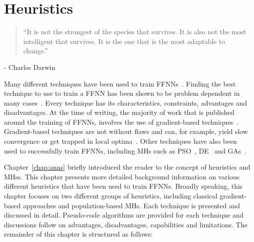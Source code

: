 \chapter{Heuristics}\label{chap:heuristics}

\begin{quotation}
      ``It is not the strongest of the species that survives. It is also not the most intelligent that survives. It is the one that is the most adaptable to change.''
\end{quotation}
\begin{flushright}
      - Charles Darwin
\end{flushright}

Many different techniques have been used to train \acp{FFNN}~\cite{ref:kingma:2014}. Finding the best technique to use to train a \acs{FFNN} has been shown to be problem dependent in many cases~\cite{ref:kheiri:2017}. Every technique has its characteristics, constraints, advantages and disadvantages. At the time of writing, the majority of work that is published around the training of \acp{FFNN}, involves the use of gradient-based techniques~\cite{ref:nel:2021}. Gradient-based techniques are not without flaws and can, for example, yield slow convergence or get trapped in local optima~\cite{ref:mingguang:2009}. Other techniques have also been used to successfully train \acp{FFNN}, including \acp{MH} such as \acf{PSO}~\cite{ref:rakitianskaia:2012, ref:vanwyk:2014}, \acf{DE}~\cite{ref:espinal:2011} and \acfp{GA}~\cite{ref:gupta:1999}.

Chapter~\ref{chap:anns} briefly introduced the reader to the concept of heuristics and \acfp{MH}s. This chapter presents more detailed background information on various different heuristics that have been used to train \acp{FFNN}. Broadly speaking, this chapter focuses on two different groups of heuristics, including classical gradient-based approaches and population-based \acp{MH}. Each technique is presented and discussed in detail. Pseudo-code algorithms are provided for each technique and discussions follow on advantages, disadvantages, capabilities and limitations. The remainder of this chapter is structured as follows:

